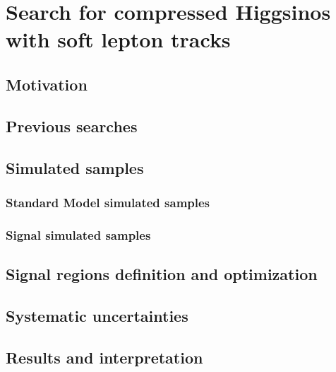 \chapter{Search for compressed Higgsinos  with soft lepton tracks}

\section{Motivation}

\section{Previous searches}




\section{Simulated samples}
\subsection{Standard Model simulated samples}
\label{sec:sm-mc}
\subsection{Signal simulated samples}
\label{sec:signal-simulation}









\clearpage
\section{Signal regions definition and optimization}
\label{sec:signal-regions}

\clearpage
\section{Systematic uncertainties}
\label{sec:systematic-uncertainties}

\clearpage
\section{Results and interpretation}


